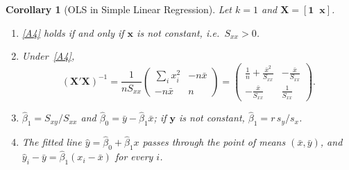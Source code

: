 \documentclass[14pt]{extarticle}
\theoremstyle{plain}
\newtheorem{corollary}[theorem]{Corollary}
\theoremstyle{definition}
\theoremstyle{remark}
\newcommand{\bX}{\mathbf{X}}
\newcommand{\by}{\mathbf{y}}
\newcommand{\bx}{\mathbf{x}}
\newcommand{\bone}{\mathbf{1}}
\begin{document}
\begin{corollary}[OLS in Simple Linear Regression]\label{cor:slr}
Let $k = 1$ and $\bX = [\bone \;\; \bx]$.
\begin{enumerate}[label=\textup{(\roman*)}]
\item \ref{A4} holds if and only if $\bx$ is not constant, i.e.\ $S_{xx} > 0$.
\item\label{slr:ii} Under~\ref{A4},
\[
(\bX'\bX)^{-1} = \frac{1}{nS_{xx}}\begin{pmatrix} \sum_i x_i^2 & -n\bar x\\ -n\bar x & n\end{pmatrix} = \begin{pmatrix} \frac{1}{n} + \frac{\bar x^2}{S_{xx}} & -\frac{\bar x}{S_{xx}}\\[2pt] -\frac{\bar x}{S_{xx}} & \frac{1}{S_{xx}}\end{pmatrix}.
\]
\item\label{slr:iii} $\hat\beta_1 = S_{xy}/S_{xx}$ and $\hat\beta_0 = \bar y - \hat\beta_1\bar x$; if $\by$ is not constant, $\hat\beta_1 = r\,s_y/s_x$.
\item\label{slr:iv} The fitted line $\hat y = \hat\beta_0 + \hat\beta_1 x$ passes through the point of means $(\bar x, \bar y)$, and $\hat y_i - \bar y = \hat\beta_1(x_i - \bar x)$ for every $i$.
\end{enumerate}
\end{corollary}
\end{document}
